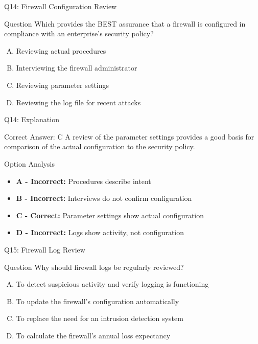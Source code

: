 \documentclass{beamer}
\begin{document}
	\begin{frame}{Q14: Firewall Configuration Review}
		\begin{block}{Question}
			Which provides the BEST assurance that a firewall is configured in compliance with an enterprise's security policy?
		\end{block}
		\begin{enumerate}[(A)]
			\item Reviewing actual procedures
			\item Interviewing the firewall administrator
			\item Reviewing parameter settings
			\item Reviewing the log file for recent attacks
		\end{enumerate}
	\end{frame}
	
	\begin{frame}{Q14: Explanation}
		\begin{block}{Correct Answer: C}
			A review of the parameter settings provides a good basis for comparison of the actual configuration to the security policy.
		\end{block}
		\begin{block}{Option Analysis}
			\begin{itemize}
				\item \textbf{A - Incorrect:} Procedures describe intent
				\item \textbf{B - Incorrect:} Interviews do not confirm configuration
				\item \textbf{C - Correct:} Parameter settings show actual configuration
				\item \textbf{D - Incorrect:} Logs show activity, not configuration
			\end{itemize}
		\end{block}
	\end{frame}
	
	\begin{frame}{Q15: Firewall Log Review}
		\begin{block}{Question}
			Why should firewall logs be regularly reviewed?
		\end{block}
		\begin{enumerate}[(A)]
			\item To detect suspicious activity and verify logging is functioning
			\item To update the firewall's configuration automatically
			\item To replace the need for an intrusion detection system
			\item To calculate the firewall's annual loss expectancy
		\end{enumerate}
	\end{frame}
	
\end{document}
